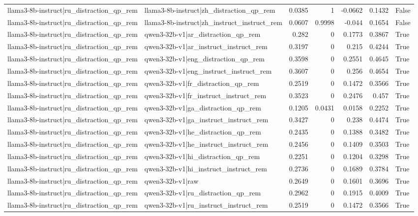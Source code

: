\begin{table}
\begin{tabular}{l l r r r r l}
llama3-8b-instruct|ru_distraction_qp_rem & llama3-8b-instruct|zh_distraction_qp_rem & 0.0385 & 1 & -0.0662 & 0.1432 & False \\
llama3-8b-instruct|ru_distraction_qp_rem & llama3-8b-instruct|zh_instruct_instruct_rem & 0.0607 & 0.9998 & -0.044 & 0.1654 & False \\
llama3-8b-instruct|ru_distraction_qp_rem & qwen3-32b-v1|ar_distraction_qp_rem & 0.282 & 0 & 0.1773 & 0.3867 & True \\
llama3-8b-instruct|ru_distraction_qp_rem & qwen3-32b-v1|ar_instruct_instruct_rem & 0.3197 & 0 & 0.215 & 0.4244 & True \\
llama3-8b-instruct|ru_distraction_qp_rem & qwen3-32b-v1|eng_distraction_qp_rem & 0.3598 & 0 & 0.2551 & 0.4645 & True \\
llama3-8b-instruct|ru_distraction_qp_rem & qwen3-32b-v1|eng_instruct_instruct_rem & 0.3607 & 0 & 0.256 & 0.4654 & True \\
llama3-8b-instruct|ru_distraction_qp_rem & qwen3-32b-v1|fr_distraction_qp_rem & 0.2519 & 0 & 0.1472 & 0.3566 & True \\
llama3-8b-instruct|ru_distraction_qp_rem & qwen3-32b-v1|fr_instruct_instruct_rem & 0.3523 & 0 & 0.2476 & 0.457 & True \\
llama3-8b-instruct|ru_distraction_qp_rem & qwen3-32b-v1|ga_distraction_qp_rem & 0.1205 & 0.0431 & 0.0158 & 0.2252 & True \\
llama3-8b-instruct|ru_distraction_qp_rem & qwen3-32b-v1|ga_instruct_instruct_rem & 0.3427 & 0 & 0.238 & 0.4474 & True \\
llama3-8b-instruct|ru_distraction_qp_rem & qwen3-32b-v1|he_distraction_qp_rem & 0.2435 & 0 & 0.1388 & 0.3482 & True \\
llama3-8b-instruct|ru_distraction_qp_rem & qwen3-32b-v1|he_instruct_instruct_rem & 0.2456 & 0 & 0.1409 & 0.3503 & True \\
llama3-8b-instruct|ru_distraction_qp_rem & qwen3-32b-v1|hi_distraction_qp_rem & 0.2251 & 0 & 0.1204 & 0.3298 & True \\
llama3-8b-instruct|ru_distraction_qp_rem & qwen3-32b-v1|hi_instruct_instruct_rem & 0.2736 & 0 & 0.1689 & 0.3784 & True \\
llama3-8b-instruct|ru_distraction_qp_rem & qwen3-32b-v1|raw & 0.2649 & 0 & 0.1601 & 0.3696 & True \\
llama3-8b-instruct|ru_distraction_qp_rem & qwen3-32b-v1|ru_distraction_qp_rem & 0.2962 & 0 & 0.1915 & 0.4009 & True \\
llama3-8b-instruct|ru_distraction_qp_rem & qwen3-32b-v1|ru_instruct_instruct_rem & 0.2519 & 0 & 0.1472 & 0.3566 & True \\

\end{tabular}
\end{table}
